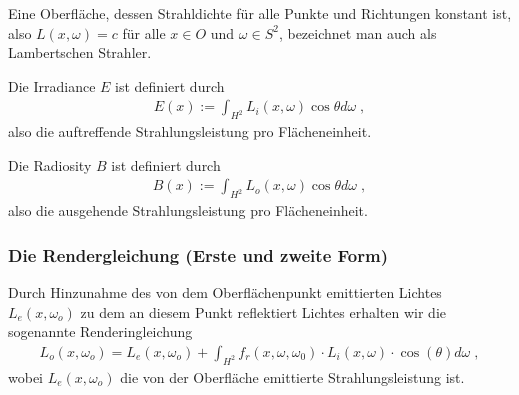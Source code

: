 \begin{Definition}
Eine Oberfläche, dessen Strahldichte für alle Punkte und Richtungen konstant ist, also
$L(x, \omega) = c$  für alle $x \in O$ und $\omega \in S^2$, bezeichnet man auch als Lambertschen Strahler. 
\end{Definition}

\begin{Definition}
Die Irradiance $E$ ist definiert durch
\begin{align}
E(x) := \int_{H^2} L_i(x, \omega) \cos{\theta} d\omega \; ,
\end{align}
also die auftreffende Strahlungsleistung pro Flächeneinheit. 
\end{Definition}

\begin{Definition}
Die Radiosity $B$ ist definiert durch
\begin{align}
B(x) := \int_{H^2} L_o(x, \omega) \cos{\theta} d\omega \; ,
\end{align}
also die ausgehende Strahlungsleistung pro Flächeneinheit. 
\end{Definition}





 
\subsubsection{Die Rendergleichung (Erste und zweite Form)}

Durch Hinzunahme des von dem Oberflächenpunkt emittierten Lichtes $L_e(x, \omega_o)$ zu dem   an diesem Punkt reflektiert Lichtes erhalten wir die sogenannte Renderingleichung 
\begin{align}
L_o(x, \omega_o) = L_e(x, \omega_o)  + \displaystyle \int_{H^2}f_r (x, \omega, \omega_0) \cdot L_i(x, \omega)  \cdot  \cos(\theta) d\omega \; ,
\end{align}
wobei $L_e(x, \omega_o)$ die von der Oberfläche emittierte Strahlungsleistung ist. 

